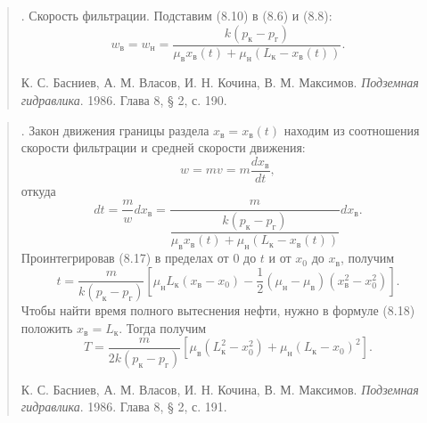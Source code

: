 \documentclass[12pt,a4paper]{article}
\begin{document}
\begin{quote}. Скорость фильтрации. Подставим (8.10) в (8.6) и (8.8):
\begin{equation}w_\text{в}=w_\text{н}=\frac{k(p_\text{к}-p_\text{г})}{\mu_\text{в}x_\text{в}(t)+\mu_\text{н}(L_\text{к}-x_\text{в}(t))}.\tag{8.13}\label{q9:eq-8-13}\end{equation}
\par\nobreak\smallskip
{\small К. С. Басниев, А. М. Власов, И. Н. Кочина, В. М. Максимов. \textit{Подземная гидравлика}. 1986. Глава 8, § 2, с. 190.}\par
\end{quote}

\begin{quote}. Закон движения границы раздела $x_\text{в}=x_\text{в}(t)$ находим из соотношения скорости фильтрации и средней скорости движения:
\[w=mv=m\frac{dx_\text{в}}{dt},\]
откуда
\begin{equation}dt=\frac{m}{w}dx_\text{в}=\frac{m}{\dfrac{k(p_\text{к}-p_\text{г})}{\mu_\text{в}x_\text{в}(t)+\mu_\text{н}(L_\text{к}-x_\text{в}(t))}}dx_\text{в}.\tag{8.17}\label{q9:eq-8-17}\end{equation}
Проинтегрировав (8.17) в пределах от 0 до $t$ и от $x_0$ до $x_\text{в}$, получим
\begin{equation}t=\frac{m}{k(p_\text{к}-p_\text{г})}\left[\mu_\text{н}L_\text{к}(x_\text{в}-x_0)-\frac12(\mu_\text{н}-\mu_\text{в})(x_\text{в}^2-x_0^2)\right].\tag{8.18}\label{q9:eq-8-18}\end{equation}
Чтобы найти время полного вытеснения нефти, нужно в формуле (8.18) положить $x_\text{в}=L_\text{к}$. Тогда получим
\[T=\frac{m}{2k(p_\text{к}-p_\text{г})}\left[\mu_\text{в}(L_\text{к}^2-x_0^2)+\mu_\text{н}(L_\text{к}-x_0)^2\right].\]
\par\nobreak\smallskip
{\small К. С. Басниев, А. М. Власов, И. Н. Кочина, В. М. Максимов. \textit{Подземная гидравлика}. 1986. Глава 8, § 2, с. 191.}\par
\end{quote}
\end{document}
